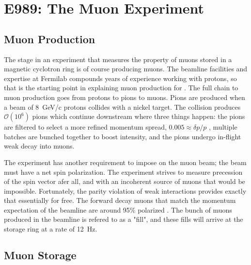 \chapter {E989: The Muon \gmtwo Experiment}

\section{Muon Production}

The stage in an experiment that measures the property of muons stored in a magnetic cyclotron ring is of course producing muons.  The beamline facilities and expertise at Fermilab compounds years of experience working with protons, so that is the starting point in explaining muon production for \gmtwo.  The full chain to muon production goes from protons to pions to muons.  Pions are produced when a beam of \SI{8}{\GeV/c} protons collides with a nickel target.  The collision produces $\mathcal{O}(10^6)$ pions which continue downstream where three things happen: the pions are filtered to select a more refined momentum spread, $0.005\approx\delta p / p$ , multiple batches are bunched together to boost intensity, and the pions undergo in-flight weak decay into muons.


The experiment has another requirement to impose on the muon beam; the beam must have a net spin polarization.  The experiment strives to measure precession of the spin vector afer all, and with an incoherent source of muons that would be impossible.  Fortunately, the parity violation of weak interactions provides exactly that essentially for free.  The forward decay muons that match the momentum expectation of the beamline are around 95\% polarized .  The bunch of muons produced in the beamline is refered to as a "fill", and these fills will arrive at the storage ring at a rate of \SI{12}{\Hz}.


\section{Muon Storage}

